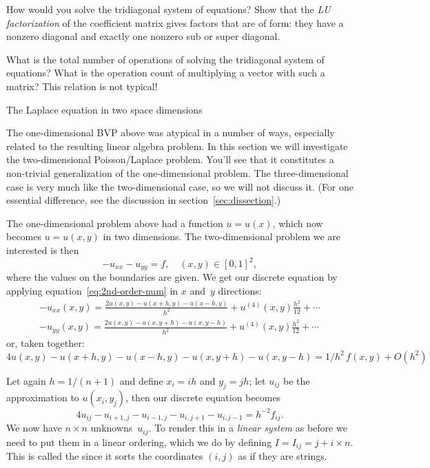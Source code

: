 \begin{exercise}
  \label{ex:solve-tri}
  How would you solve the tridiagonal
  system of equations?
  Show that the \emph{LU factorization}%
  of the coefficient matrix gives factors that are of
   form: they have a nonzero diagonal
  and exactly one nonzero sub or super diagonal.

  What is the total number of operations of solving the tridiagonal
  system of equations? What is the operation count of multiplying a
  vector with
  such a matrix? This relation is not typical!
\end{exercise}

 {The Laplace equation in two space dimensions}
\label{sec:2dbvp}

The one-dimensional \ac{BVP} above was atypical in a number of ways,
especially related to the resulting linear algebra problem. In this
section we will investigate the two-dimensional Poisson/Laplace problem.
You'll see that it constitutes a non-trivial generalization of the one-dimensional problem.
The three-dimensional case is very much like the two-dimensional case,
so we will not discuss it. (For one essential difference, see the discussion
in section~\ref{sec:dissection}.)

The one-dimensional problem above had a function $u=u(x)$, which now becomes
$u=u(x,y)$ in two dimensions. 
The two-dimensional problem we are interested is then
\begin{equation} -u_{xx}-u_{yy} = f,\quad (x,y)\in[0,1]^2,
  \label{eq:laplace}
\end{equation}
where the values on the boundaries are given. We get our discrete
equation by applying equation~\eqref{eq:2nd-order-num} in $x$ and~$y$
directions:
\begin{equation}
\begin{array}{l}
  -u_{xx}(x,y)=\frac{2u(x,y)-u(x+h,y)-u(x-h,y)}{h^2}+u^{(4)}(x,y)\frac{h^2}{12}+\cdots\\
  -u_{yy}(x,y)=\frac{2u(x,y)-u(x,y+h)-u(x,y-h)}{h^2}+u^{(4)}(x,y)\frac{h^2}{12}+\cdots
\end{array}
\end{equation}
or, taken together:
\begin{equation}
  4u(x,y)-u(x+h,y)-u(x-h,y)-u(x,y+h)-u(x,y-h)=1/h^2\,f(x,y)+O(h^2)
  \label{eq:5-point-star}
\end{equation}

Let again $h=1/(n+1)$ and
define $x_i=ih$ and $y_j=jh$; let $u_{ij}$ be the approximation to
$u(x_i,y_j)$, then
our discrete equation becomes
\begin{equation}
  4u_{ij}-u_{i+1,j}-u_{i-1,j}-u_{i,j+1}-u_{i,j-1}=h^{-2}f_{ij}.
  \label{eq:5-point-star-ij}
\end{equation}
We now have $n\times n$ unknowns~$u_{ij}$. To render this in a
%
\emph{linear system}
%
as before we need to put them in a linear ordering, which we do
by defining $I=I_{ij}=j+i\times n$. This is called the
 since it sorts the coordinates
$(i,j)$ as if they are strings.

